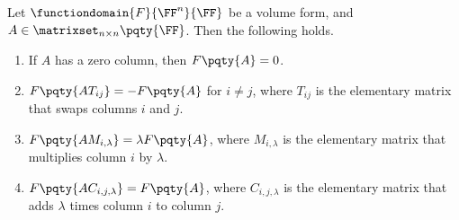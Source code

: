\begin{lemma}
    \label{lem:volume-form-properties}%
    Let \(\functiondomain{F}{\FF^n}{\FF}\) be a volume form, and \(A \in \matrixset_{n \times n} \pqty{\FF}\). Then the following holds.

    \begin{enumerate}[label=(\roman*)]
        \item If \(A\) has a zero column, then \(F\pqty{A} = 0\).
        \item \(F\pqty{A T_{ij}} = - F\pqty{A}\) for \(i \neq j\), where \(T_{ij}\) is the elementary matrix that swaps columns \(i\) and \(j\).
        \item \(F\pqty{A M_{i, \lambda}} = \lambda F\pqty{A}\), where \(M_{i, \lambda}\) is the elementary matrix that multiplies column \(i\) by \(\lambda\).
        \item \(F\pqty{A C_{i, j, \lambda}} = F\pqty{A}\), where \(C_{i, j, \lambda}\) is the elementary matrix that adds \(\lambda\) times column \(i\) to column \(j\).
    \end{enumerate}
\end{lemma}

